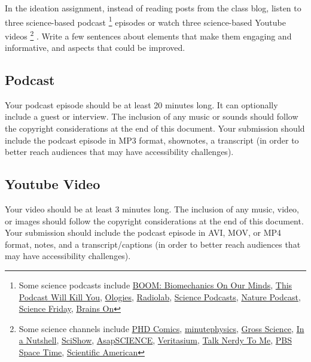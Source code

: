 \documentclass[11pt]{article}
\begin{document}
In the ideation assignment, instead of reading posts from the class blog, listen to three science-based podcast%
\footnote{Some science podcasts include 
\href{https://soundcloud.com/biomechanics-on-our-minds}{BOOM: Biomechanics On Our Minds}, 
\href{http://thispodcastwillkillyou.com/}{This Podcast Will Kill You}, 
\href{https://www.alieward.com/ologies}{Ologies}, 
\href{https://www.wnycstudios.org/podcasts/radiolab}{Radiolab}, 
\href{https://www.sciencemag.org/podcasts}{Science Podcasts}, 
\href{https://www.nature.com/nature/articles?type=nature-podcast}{Nature Podcast}, 
\href{https://www.sciencefriday.com/listen/}{Science Friday}, 
\href{https://www.brainson.org/}{Brains On}
} 
episodes or watch three science-based Youtube videos%
\footnote{Some science channels include
\href{https://www.youtube.com/user/phdcomics}{PHD Comics}, 
\href{https://www.youtube.com/user/minutephysics}{minutephysics}, 
\href{https://www.youtube.com/user/grossscienceshow}{Gross Science}, 
\href{https://www.youtube.com/user/Kurzgesagt/videos}{In a Nutshell}, 
\href{https://www.youtube.com/user/scishow}{SciShow}, 
\href{https://www.youtube.com/user/AsapSCIENCE}{AsapSCIENCE}, 
\href{https://www.youtube.com/user/1veritasium}{Veritasium}, 
\href{https://www.youtube.com/user/talknerdytomeHP}{Talk Nerdy To Me}, 
\href{https://www.youtube.com/channel/UC7_gcs09iThXybpVgjHZ_7g}{PBS Space Time}, 
\href{https://www.youtube.com/user/SciAmerican/}{Scientific American}
}
.  Write a few sentences about elements that make them engaging and informative, and aspects that could be improved.  


\subsection{Podcast}
Your podcast episode should be at least 20 minutes long.  
It can optionally include a guest or interview.  
The inclusion of any music or sounds should follow the copyright considerations at the end of this document.
Your submission should include the podcast episode in MP3 format, shownotes, a transcript (in order to better reach audiences that may have accessibility challenges).


\subsection{Youtube Video}
Your video should be at least 3 minutes long.
The inclusion of any music, video, or images should follow the copyright considerations at the end of this document.
Your submission should include the podcast episode in AVI, MOV, or MP4 format, notes, and a transcript/captions (in order to better reach audiences that may have accessibility challenges).
\end{document}
